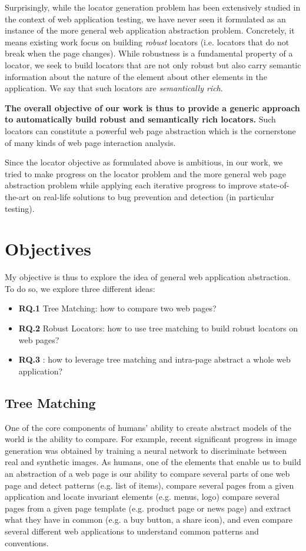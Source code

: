 Surprisingly, while the locator generation problem has been extensively studied in the context of web application testing, we have never seen it formulated as an instance of the more general web application abstraction problem.
Concretely, it means existing work focus on building \textit{robust} locators (i.e. locators that do not break when the page changes).
While robustness is a fundamental property of a locator, we seek to build locators that are not only robust but also carry semantic information about the nature of the element about other elements in the application.
We say that such locators are \textit{semantically rich}. 

\textbf{The overall objective of our work is thus to provide a generic approach to automatically build robust and semantically rich locators.}
Such locators can constitute a powerful web page abstraction which is the cornerstone of many kinds of web page interaction analysis.

Since the locator objective as formulated above is ambitious, in our work, we tried to make progress on the locator problem and the more general web page abstraction problem while applying each iterative progress to improve state-of-the-art on real-life solutions to bug prevention and detection (in particular testing).

\section{Objectives}
My objective is thus to explore the idea of general web application abstraction. To do so, we explore three different ideas:
\begin{itemize}[label={}]
\item \textbf{RQ.1 } Tree Matching: how to compare two web pages?
\item \textbf{RQ.2 } Robust Locators: how to use tree matching to build robust locators on web pages?
\item \textbf{RQ.3 } \appstract{}: how to leverage tree matching and intra-page abstract a whole web application?
\end{itemize}

\subsection{Tree Matching}
One of the core components of humans' ability to create abstract models of the world is the ability to compare.
For example, recent significant progress in image generation was obtained by training a neural network to discriminate between real and synthetic images. As humans, one of the elements that enable us to build an abstraction of a web page is our ability 
to compare several parts of one web page and detect patterns (e.g. list of items), 
compare several pages from a given application and locate invariant elements (e.g. menus, logo)
compare several pages from a given page template (e.g. product page or news page) and extract what they have in common (e.g. a buy button, a share icon),
and even compare several different web applications to understand common patterns and conventions.

